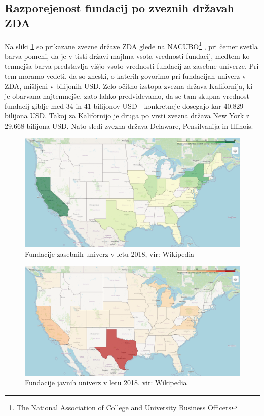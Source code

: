 \documentclass[12pt, a4paper]{article}
\begin{document}
\subsection{Razporejenost fundacij po zveznih državah ZDA}

Na sliki \ref{Slika 1}  so prikazane zvezne države ZDA glede na NACUBO\footnote{The National Association of College and University Business Officers} \cite{wiki}, pri čemer svetla barva pomeni, da je v tisti državi majhna vsota vrednosti fundacij, medtem ko temnejša barva predstavlja višjo vsoto vrednosti fundacij za zasebne univerze. Pri tem moramo vedeti, da so zneski, o katerih govorimo pri fundacijah univerz v ZDA, mišljeni v bilijonih USD. Zelo očitno izstopa zvezna država Kalifornija, ki je obarvana najtemnejše, zato lahko predvidevamo, da se tam skupna vrednost fundacij giblje med 34 in 41 bilijonov USD - konkretneje dosegajo kar 40.829 bilijona USD. Takoj za Kalifornijo je druga po vrsti zvezna država New York z 29.668 bilijona USD. Nato sledi zvezna država Delaware, Pensilvanija in Illinois. \\

\begin{figure}[!h]
\centering
\includegraphics[width = 15 cm]{grafi_zemljevidi/zemljevid_zasebnih.png}
\caption{Fundacije zasebnih univerz v letu 2018, vir: Wikipedia}
\label{Slika 1}
\end{figure}


\begin{figure}[!h]
\centering
\includegraphics[width = 15 cm]{grafi_zemljevidi/zemljevid_javnih.png}
\caption{Fundacije javnih univerz v letu 2018, vir: Wikipedia}
\label{Slika 2}
\end{figure}
\end{document}
